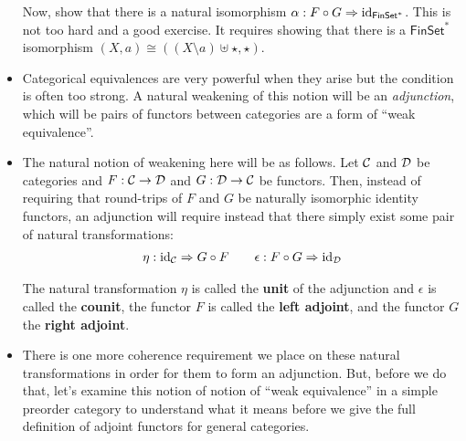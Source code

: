 \begin{itemize}
  Now, show that there is a natural isomorphism $\alpha : F \circ G \Rightarrow \operatorname{id}_{\textsf{FinSet}^*}$.
  This is not too hard and a good exercise. 
  It requires showing that there is a $\mathsf{FinSet}^*$ isomorphism 
  $(X, a) \cong ((X \setminus a) \uplus \star, \star)$. 

  \item Categorical equivalences are very powerful when they arise but 
  the condition is often too strong. 
  A natural weakening of this notion will be an \emph{adjunction}, which will be pairs of 
  functors between categories are a form of ``weak equivalence''. 

  \item The natural notion of weakening here will be as follows. Let $\mathcal C$ and $\mathcal D$ 
  be categories and $F : \mathcal C \to \mathcal D$ and $G : \mathcal D \to \mathcal C$ be functors. 
  Then, instead of requiring that round-trips of $F$ and $G$ be naturally isomorphic identity functors, 
  an adjunction will require instead that there simply exist some pair of natural transformations:
  \begin{align}
    \eta : \operatorname{id}_\mathcal C \Rightarrow G \circ F  \qquad
    \epsilon :  F \circ G \Rightarrow \operatorname{id}_\mathcal D 
    \label{eq:adjoint-units}
  \end{align}

  The natural transformation $\eta$ is called the \textbf{unit} of the adjunction and 
  $\epsilon$ is called the \textbf{counit}, the functor $F$ is called 
  the \textbf{left adjoint}, and the functor $G$ the \textbf{right adjoint}.

  \item There is one more coherence requirement we place on these natural
  transformations in order for them to form an adjunction. But, before we do
  that, let's examine this notion of notion of ``weak equivalence'' in a 
  simple preorder category to understand what it means before we give the 
  full definition of adjoint functors for general categories.
\end{itemize}

